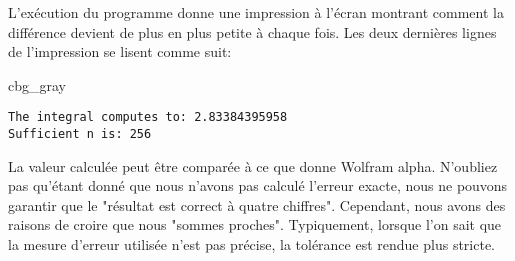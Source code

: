 \documentclass[%
oneside,                 %
final,                   %
10pt,french]{article}
\newenvironment{_cod_tight}[1]{
   \def\FrameCommand{\colorbox{#1}}
   \FrameRule0.6pt\MakeFramed {\FrameRestore}\vskip3mm}
   {\vskip0mm\endMakeFramed}
\newenvironment{cod}[1]{
\bgroup\rmfamily
\fboxsep=0mm\relax
\begin{_cod_tight}{#1}
\list{}{\parsep=-2mm\parskip=0mm\topsep=0pt\leftmargin=2mm
\rightmargin=2\leftmargin\leftmargin=4pt\relax}
\item\relax}
{\endlist\end{_cod_tight}\egroup}
\newenvironment{doconceexercise}{}{}
\begin{document}
\begin{doconceexercise}
L'exécution du programme donne une impression à l'écran montrant comment la différence devient de plus en plus petite à chaque fois. Les deux dernières lignes de l'impression se lisent comme suit:
\begin{cod}{cbg_gray}\begin{verbatim}
The integral computes to: 2.83384395958
Sufficient n is: 256
\end{verbatim}
\end{cod}
\noindent
La valeur calculée peut être comparée à ce que donne Wolfram alpha. N'oubliez pas qu'étant donné que nous n'avons pas calculé l'erreur exacte, nous ne pouvons garantir que le "résultat est correct à quatre chiffres". Cependant, nous avons des raisons de croire que nous "sommes proches". Typiquement, lorsque l'on sait que la mesure d'erreur utilisée n'est pas précise, la tolérance est rendue plus stricte.


\end{doconceexercise}



\end{document}
